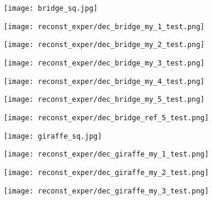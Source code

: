 \begin{figure}[H]
	\centering
	\begin{subfigure}[b]{0.13\linewidth}
		\texttt{[image: bridge\_sq.jpg]} %
	\end{subfigure}
	\begin{subfigure}[b]{0.13\linewidth}
		\texttt{[image: reconst\_exper/dec\_bridge\_my\_1\_test.png]} %
	\end{subfigure}
	\begin{subfigure}[b]{0.13\linewidth}
		\texttt{[image: reconst\_exper/dec\_bridge\_my\_2\_test.png]} %
	\end{subfigure}
	\begin{subfigure}[b]{0.13\linewidth}
		\texttt{[image: reconst\_exper/dec\_bridge\_my\_3\_test.png]} %
	\end{subfigure}
	\begin{subfigure}[b]{0.13\linewidth}
		\texttt{[image: reconst\_exper/dec\_bridge\_my\_4\_test.png]} %
	\end{subfigure}
	\begin{subfigure}[b]{0.13\linewidth}
		\texttt{[image: reconst\_exper/dec\_bridge\_my\_5\_test.png]} %
	\end{subfigure}
	\begin{subfigure}[b]{0.13\linewidth}
		\texttt{[image: reconst\_exper/dec\_bridge\_ref\_5\_test.png]} %
	\end{subfigure}
	\centering
	\begin{subfigure}[b]{0.13\linewidth}
		\texttt{[image: giraffe\_sq.jpg]} %
	\end{subfigure}
	\begin{subfigure}[b]{0.13\linewidth}
		\texttt{[image: reconst\_exper/dec\_giraffe\_my\_1\_test.png]} %
	\end{subfigure}
	\begin{subfigure}[b]{0.13\linewidth}
		\texttt{[image: reconst\_exper/dec\_giraffe\_my\_2\_test.png]} %
	\end{subfigure}
	\begin{subfigure}[b]{0.13\linewidth}
		\texttt{[image: reconst\_exper/dec\_giraffe\_my\_3\_test.png]} %

\end{subfigure}
\end{figure}
